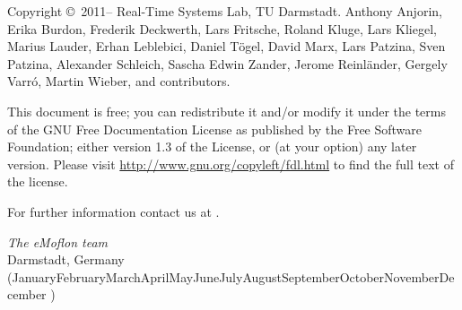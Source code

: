 \newcommand{\monthword}[1]{\ifcase#1\or January\or February\or March\or April\or May\or June\or July\or August\or September\or October\or November\or December\fi}
\begin{small} 
Copyright \copyright~2011--\the\year{} Real-Time Systems Lab, TU Darmstadt.
Anthony Anjorin, Erika Burdon, Frederik Deckwerth, Lars Fritsche, Roland Kluge, Lars Kliegel, Marius Lauder,
Erhan Leblebici, Daniel Tögel, David Marx, Lars Patzina, Sven Patzina, Alexander Schleich, Sascha Edwin Zander, Jerome Reinländer, Gergely Varró, Martin Wieber, and contributors.

This document is free; you can redistribute it and/or modify it under the terms of the GNU Free Documentation License as published by the Free Software Foundation; either version 1.3 of the License, or (at your option) any later version.
Please visit \href{http://www.gnu.org/copyleft/fdl.html}{http://www.gnu.org/copyleft/fdl.html} to find the full text of the license.
 
For further information contact us at \eMoflonContact.
  
\vskip3cm
\textit{The eMoflon team}\\
Darmstadt, Germany (\monthword{\month} \the\year)
\end{small}